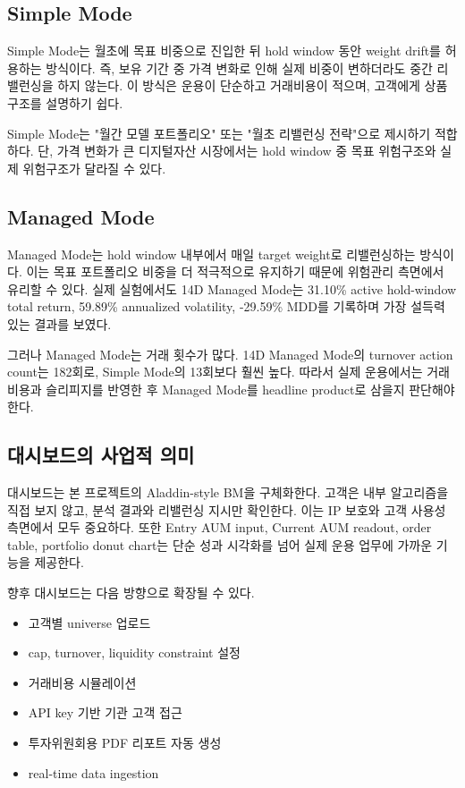 \documentclass[12pt,a4paper]{article}
\begin{document}

\subsection{Simple Mode}

Simple Mode는 월초에 목표 비중으로 진입한 뒤 hold window 동안 weight drift를 허용하는 방식이다. 즉, 보유 기간 중 가격 변화로 인해 실제 비중이 변하더라도 중간 리밸런싱을 하지 않는다. 이 방식은 운용이 단순하고 거래비용이 적으며, 고객에게 상품 구조를 설명하기 쉽다.

Simple Mode는 "월간 모델 포트폴리오" 또는 "월초 리밸런싱 전략"으로 제시하기 적합하다. 단, 가격 변화가 큰 디지털자산 시장에서는 hold window 중 목표 위험구조와 실제 위험구조가 달라질 수 있다.

\subsection{Managed Mode}

Managed Mode는 hold window 내부에서 매일 target weight로 리밸런싱하는 방식이다. 이는 목표 포트폴리오 비중을 더 적극적으로 유지하기 때문에 위험관리 측면에서 유리할 수 있다. 실제 실험에서도 14D Managed Mode는 31.10\% active hold-window total return, 59.89\% annualized volatility, -29.59\% MDD를 기록하며 가장 설득력 있는 결과를 보였다.

그러나 Managed Mode는 거래 횟수가 많다. 14D Managed Mode의 turnover action count는 182회로, Simple Mode의 13회보다 훨씬 높다. 따라서 실제 운용에서는 거래비용과 슬리피지를 반영한 후 Managed Mode를 headline product로 삼을지 판단해야 한다.

\subsection{대시보드의 사업적 의미}

대시보드는 본 프로젝트의 Aladdin-style BM을 구체화한다. 고객은 내부 알고리즘을 직접 보지 않고, 분석 결과와 리밸런싱 지시만 확인한다. 이는 IP 보호와 고객 사용성 측면에서 모두 중요하다. 또한 Entry AUM input, Current AUM readout, order table, portfolio donut chart는 단순 성과 시각화를 넘어 실제 운용 업무에 가까운 기능을 제공한다.

향후 대시보드는 다음 방향으로 확장될 수 있다.

\begin{itemize}
\item 고객별 universe 업로드
\item cap, turnover, liquidity constraint 설정
\item 거래비용 시뮬레이션
\item API key 기반 기관 고객 접근
\item 투자위원회용 PDF 리포트 자동 생성
\item real-time data ingestion
\end{itemize}
\end{document}
